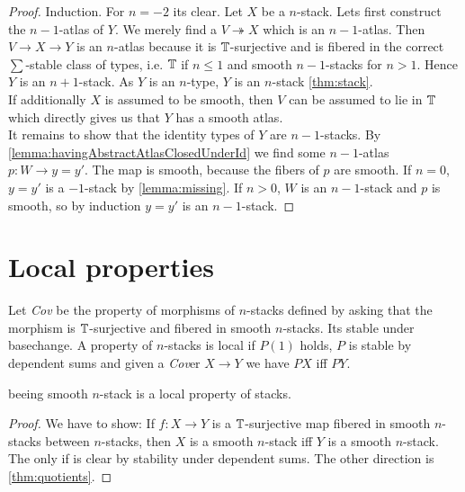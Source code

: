\documentclass{article}
\newcommand{\Cov}{\emph{Cov} }
\newcommand{\Cover}{\emph{Cov}er }
\begin{document}
\begin{proof}
	Induction.
	For $n = -2$ its clear.
	Let $X$ be a  $n$-stack. Lets first construct the $n-1$-atlas of $Y$.
	We merely find a $V \twoheadrightarrow X$ which is an $n-1$-atlas.  Then $V \to X \to Y$ is an $n$-atlas because it is $\mathbb{T}$-surjective and is fibered in the correct $\sum$-stable class of types, i.e. $\mathbb{T}$ if $n \le 1$ and  smooth $n-1$-stacks for $n > 1$. Hence $Y$ is an $n+1$-stack. As $Y$ is an $n$-type, $Y$ is an $n$-stack \ref{thm:stack}. \\
	If additionally $X$ is assumed to be smooth, then $V$ can be assumed to lie in $\mathbb{T}$ which directly gives us that $Y$ has a smooth atlas. \\
	It remains to show that the identity types of $Y$ are  $n-1$-stacks. By \ref{lemma:havingAbstractAtlasClosedUnderId} we  find some $n-1$-atlas $p : W \to y=y'$. The map is smooth, because the fibers of $p$ are smooth. %
	If $n=0$, $y = y'$ is a $-1$-stack by \ref{lemma:missing}. If $n > 0$, $W$ is an $n-1$-stack and $p$ is smooth, so by induction $y = y'$ is an $n-1$-stack. %
\end{proof}
\section{Local properties}

\begin{definition}
Let \Cov be the property of morphisms of  $n$-stacks defined by asking that the morphism is $\mathbb{T}$-surjective and fibered in smooth $n$-stacks. Its stable under basechange. A property of  $n$-stacks is local if $P(1)$ holds, $P$ is stable by dependent sums and given a \Cover  $X \to Y$ we have $P X$ iff $P Y$.
\end{definition}
\begin{example}    
    beeing smooth $n$-stack is a local property of stacks.
\end{example}
\begin{proof}
    We have to show: If $f : X \to Y$ is a $\mathbb{T}$-surjective map fibered in smooth $n$-stacks between  $n$-stacks, then $X$ is a smooth $n$-stack iff $Y$ is a smooth $n$-stack.
    The only if is clear by stability under dependent sums. The other direction is \ref{thm:quotients}.
    
\end{proof}
\end{document}
